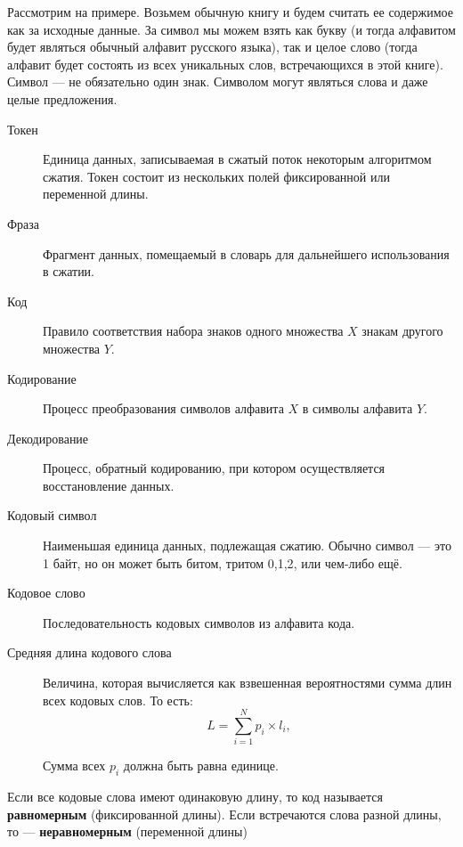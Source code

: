 \bigskip

Рассмотрим на примере. Возьмем обычную книгу и будем считать ее содержимое как за исходные данные.
За символ мы можем взять как букву (и тогда алфавитом будет являться обычный алфавит русского языка), так и целое слово (тогда алфавит будет состоять из всех уникальных слов, встречающихся в этой книге).
Символ --- не обязательно один знак.
Символом могут являться слова и даже целые предложения.

\begin{description}
    \item [Токен]
          Единица данных, записываемая в сжатый поток некоторым алгоритмом сжатия. Токен состоит из нескольких полей фиксированной или переменной длины.
    \item [Фраза]
          Фрагмент данных, помещаемый в словарь для дальнейшего использования в сжатии.
    \item [Код]
          Правило соответствия набора знаков одного множества $X$ знакам другого множества $Y$.
    \item [Кодирование]
          Процесс преобразования символов алфавита $X$ в символы алфавита $Y$.
    \item [Декодирование]
          Процесс, обратный кодированию, при котором осуществляется восстановление данных.
    \item[Кодовый символ]
          Наименьшая единица данных, подлежащая сжатию. Обычно символ --- это 1 байт, но он может быть битом, тритом {0,1,2}, или чем-либо ещё.
    \item[Кодовое слово]
          Последовательность кодовых символов из алфавита кода.
    \item [Средняя длина кодового слова]
          Величина, которая вычисляется как взвешенная вероятностями сумма длин всех кодовых слов. То есть:
          \[ L = \sum_{i=1}^{N}p_{i} \times l_{i}, \]
          Сумма всех $p_{i}$ должна быть равна единице.
\end{description}

Если все кодовые слова имеют одинаковую длину, то код называется \textbf{равномерным} (фиксированной длины).
Если встречаются слова разной длины, то --- \textbf{неравномерным} (переменной длины)

